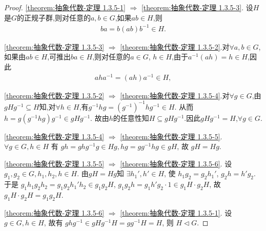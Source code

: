 \documentclass[../../main.tex]{subfiles}%
\begin{document}
\begin{proof}

\ref{theorem:抽象代数-定理 1.3.5-1} $\Rightarrow$ \ref{theorem:抽象代数-定理 1.3.5-3}. 设$H$是$G$的正规子群,则对任意的$a,b\in G$,如果$ab\in H$,则
\begin{align*}
ba = b(ab)b^{-1}\in H.
\end{align*}

\ref{theorem:抽象代数-定理 1.3.5-3} $\Rightarrow$ \ref{theorem:抽象代数-定理 1.3.5-2}.对$\forall a,b\in G$,如果由$ab\in H$,可推出$ba\in H$,则对任意的$a\in G$,
$h\in H$,由于$a^{-1}(ah)=h\in H$,因此
\begin{align*}
aha^{-1} = (ah)a^{-1}\in H,
\end{align*}

\ref{theorem:抽象代数-定理 1.3.5-2} $\Rightarrow$ \ref{theorem:抽象代数-定理 1.3.5-4}.对$\forall g\in G$,由$gHg^{-1}\subseteq H$知,对$\forall h\in H$,有$g^{-1}hg=\left( g^{-1} \right) ^{-1}hg^{-1}\in H.$
从而$h=g\left( g^{-1}hg \right) g^{-1}\in gHg^{-1}.$
故由$h$的任意性知$H\subseteq gHg^{-1}$.因此$gHg^{-1}=H$,$\forall g\in G$.

\ref{theorem:抽象代数-定理 1.3.5-4} $\Rightarrow$ \ref{theorem:抽象代数-定理 1.3.5-5}.  \( \forall g \in G, h \in H \) 有 \( gh = ghg^{-1}g \in Hg, hg = gg^{-1}hg \in gH \), 故 \( gH = Hg \).

\ref{theorem:抽象代数-定理 1.3.5-5} $\Rightarrow$ \ref{theorem:抽象代数-定理 1.3.5-6}. 设 \( g_1, g_2 \in G, h_1, h_2, h \in H \). 由$gH=Hg$知 \( \exists h_1', h' \in H \), 使 \( h_1g_2 = g_2h_1' \), \( g_2h = h'g_2 \). 于是 \( g_1h_1g_2h_2 = g_1g_2h_1'h_2 \in g_1g_2H \), \( g_1g_2h = g_1h'g_2 \cdot 1 \in g_1H \cdot g_2H \), 故 \( g_1H \cdot g_2H = g_1g_2H \).

\ref{theorem:抽象代数-定理 1.3.5-6} $\Rightarrow$ \ref{theorem:抽象代数-定理 1.3.5-1}. 设 \( g \in G, h \in H \), 故有 \( ghg^{-1} \in gHg^{-1}H = gg^{-1}H = H \), 则 \( H \lhd  G \).

\end{proof}
\end{document}
